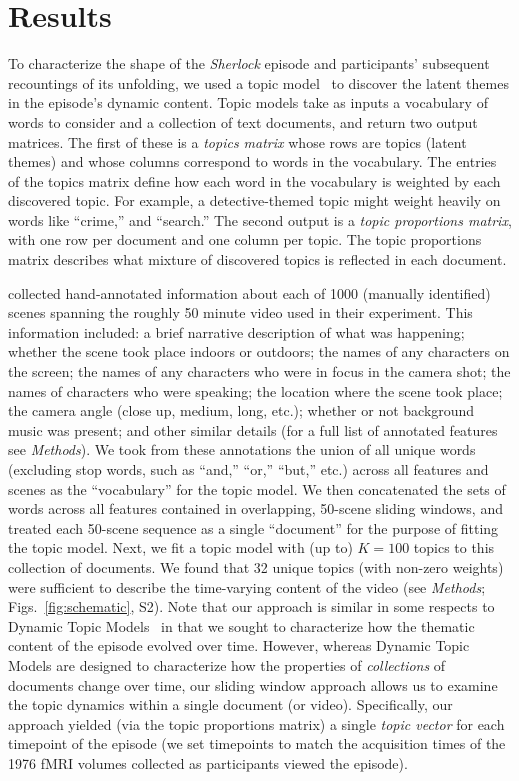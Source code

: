 \documentclass{article}
\newcommand{\topics}{S2}
\begin{document}
\section*{Results}
To characterize the shape of the \textit{Sherlock} episode and participants' subsequent recountings of its unfolding, we used a topic model~\citep{BleiEtal03} to discover the latent themes in the episode's dynamic content.  Topic models take as inputs a vocabulary of words to consider and a collection of text documents, and return two output matrices.  The first of these is a \textit{topics matrix} whose rows are topics (latent themes) and whose columns correspond to words in the vocabulary. The entries of the topics matrix define how each word in the vocabulary is weighted by each discovered topic.  For example, a detective-themed topic might weight heavily on words like ``crime,'' and ``search.''  The second output is a \textit{topic proportions matrix}, with one row per document and one column per topic.  The topic proportions matrix describes what mixture of discovered topics is reflected in each document.

\cite{ChenEtal17} collected hand-annotated information about each of 1000 (manually identified) scenes spanning the roughly 50 minute video used in their experiment.  This information included: a brief narrative description of what was happening; whether the scene took place indoors or outdoors; the names of any characters on the screen; the names of any characters who were in focus in the camera shot; the names of characters who were speaking; the location where the scene took place; the camera angle (close up, medium, long, etc.); whether or not background music was present; and other similar details (for a full list of annotated features see \textit{Methods}).  We took from these annotations the union of all unique words (excluding stop words, such as ``and,'' ``or,'' ``but,'' etc.) across all features and scenes as the ``vocabulary'' for the topic model.  We then concatenated the sets of words across all features contained in overlapping, 50-scene sliding windows, and treated each 50-scene sequence as a single ``document'' for the purpose of fitting the topic model.  Next, we fit a topic model with (up to) $K = 100$ topics to this collection of documents.  We found that 32 unique topics (with non-zero weights) were sufficient to describe the time-varying content of the video (see \textit{Methods}; Figs.~\ref{fig:schematic}, \topics).  Note that our approach is similar in some respects to Dynamic Topic Models~\citep{BleiLaff06} in that we sought to characterize how the thematic content of the episode evolved over time.  However, whereas Dynamic Topic Models are designed to characterize how the properties of \textit{collections} of documents change over time, our sliding window approach allows us to examine the topic dynamics within a single document (or video).  Specifically, our approach yielded (via the topic proportions matrix) a single \textit{topic vector} for each timepoint of the episode (we set timepoints to match the acquisition times of the 1976 fMRI volumes collected as participants viewed the episode).
\end{document}
